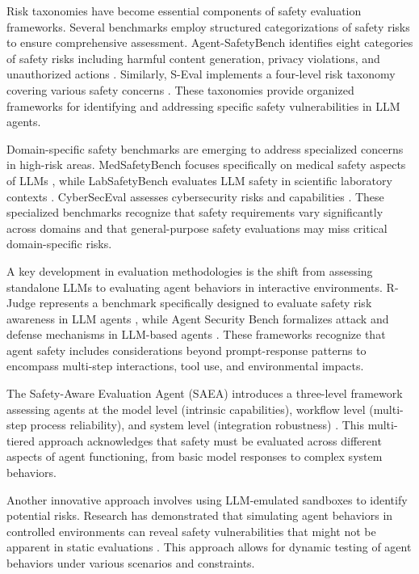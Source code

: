 \documentclass[conference]{IEEEtran}
\begin{document}
Risk taxonomies have become essential components of safety evaluation frameworks. Several benchmarks employ structured categorizations of safety risks to ensure comprehensive assessment. Agent-SafetyBench identifies eight categories of safety risks including harmful content generation, privacy violations, and unauthorized actions \cite{2412.14470}. Similarly, S-Eval implements a four-level risk taxonomy covering various safety concerns \cite{2405.14191}. These taxonomies provide organized frameworks for identifying and addressing specific safety vulnerabilities in LLM agents.

Domain-specific safety benchmarks are emerging to address specialized concerns in high-risk areas. MedSafetyBench focuses specifically on medical safety aspects of LLMs \cite{2403.03744}, while LabSafetyBench evaluates LLM safety in scientific laboratory contexts \cite{2410.14182}. CyberSecEval assesses cybersecurity risks and capabilities \cite{2408.01605}. These specialized benchmarks recognize that safety requirements vary significantly across domains and that general-purpose safety evaluations may miss critical domain-specific risks.

A key development in evaluation methodologies is the shift from assessing standalone LLMs to evaluating agent behaviors in interactive environments. R-Judge represents a benchmark specifically designed to evaluate safety risk awareness in LLM agents \cite{2401.10019}, while Agent Security Bench formalizes attack and defense mechanisms in LLM-based agents \cite{2410.02644}. These frameworks recognize that agent safety includes considerations beyond prompt-response patterns to encompass multi-step interactions, tool use, and environmental impacts.

The Safety-Aware Evaluation Agent (SAEA) introduces a three-level framework assessing agents at the model level (intrinsic capabilities), workflow level (multi-step process reliability), and system level (integration robustness) \cite{2504.15585}. This multi-tiered approach acknowledges that safety must be evaluated across different aspects of agent functioning, from basic model responses to complex system behaviors.

Another innovative approach involves using LLM-emulated sandboxes to identify potential risks. Research has demonstrated that simulating agent behaviors in controlled environments can reveal safety vulnerabilities that might not be apparent in static evaluations \cite{2309.15817}. This approach allows for dynamic testing of agent behaviors under various scenarios and constraints.
\end{document}
